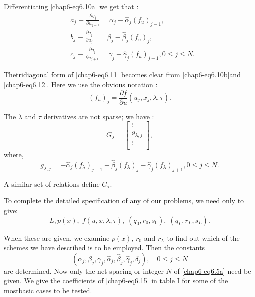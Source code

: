 Differentiating \eqref{chap6-eq6.10a} we get that :
\begin{equation*}
\begin{split}
& a_j \equiv \frac{\partial g_j}{\partial u_{j-1}} = \alpha_j -
  \hat{\alpha}_j (f_u)_{j-1},\\ 
& b_j \equiv \frac{\partial g_j}{\partial u_j} ~~~= \beta_j -
  \hat{\beta}_j (f_u)_j,\\ 
& c_j \equiv \frac{\partial g_j}{\partial u_{j+1}} = \gamma_j -
  \hat{\gamma}_j(f_u)_{j+1}, 0 \leq j \leq N.
\end{split}\tag{6.12} \label{chap6-eq6.12}
\end{equation*}

The\pageoriginale tridiagonal form of \eqref{chap6-eq6.11} becomes
clear from 
\eqref{chap6-eq6.10b}\break and
\eqref{chap6-eq6.12}. Here we use the obvious notation : 
$$
(f_u)_j = \frac{\partial f}{\partial u} (u_j,x_j,\lambda, \tau ).
$$

The $\lambda$ and $\tau$ derivatives are not sparse; we have : 
\begin{equation*}
G_{\lambda} =
\begin{bmatrix}
\vdots\\
g_{\lambda,j}\\
\vdots\\
\end{bmatrix}
, \tag{6.13}\label{chap6-eq6.13}
\end{equation*}
where,
$$ 
g_{\lambda,j} = -\hat{\alpha}_j(f_\lambda)_{j-1}
-\hat{\beta}_j(f_\lambda)_j - \hat{\gamma}_j (f_\lambda)_{j+1}, 0 \leq
j \leq N. 
$$

A similar set of relations define $G_\tau$.

To complete the detailed specification of any of our problems, we need
only to give: 
\begin{equation*}
L,p(x), \; f(u,x,\lambda, \tau ), \; (q_0,r_0,s_0), \;
(q_L,r_L,s_L).\tag{6.14}\label{chap6-eq6.14} 
\end{equation*}

When these are given, we examine $p(x)$, $r_0$ and $r_L$ to find out
which of the schemes we have described is to be employed. Then the
constants 
\begin{equation*}
(\alpha_j, \beta_j, \gamma_j, \hat{\alpha}_j, \hat{\beta}_j,
  \hat{\gamma}_j, \delta_j), \quad 0 \leq j \leq N
  \tag{6.15} \label{chap6-eq6.15} 
\end{equation*}
are determined. Now only the net spacing or integer $N$ of \eqref{chap6-eq6.5a}
need be given. We give the coefficients of \eqref{chap6-eq6.15} in
table I for some of the most\pageoriginale basic cases to be tested. 


